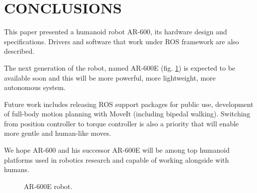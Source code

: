 \documentclass[letterpaper, 10 pt, conference]{ieeeconf}  %
\begin{document}
\section{CONCLUSIONS}

This paper presented a humanoid robot AR-600, its hardware design and
specifications. Drivers and software that work under ROS framework are
also described.

The next generation of the robot, named AR-600E (fig. \ref{img:ar600e}) is
expected to be available soon and this will be more powerful, more lightweight,
more autonomous system.

Future work includes releasing ROS support packages for public use, development
of full-body motion planning with MoveIt (including bipedal walking). Switching
from position controller to torque controller is also a priority that
will enable more gentle and human-like moves. 

We hope AR-600 and his successor AR-600E will be among top humanoid platforms
used in robotics research and capable of working alongside with humans.

\begin{figure} [thpb]
      \centering
      \caption{AR-600E robot.}
      \label{img:ar600e}
\end{figure}
\end{document}
